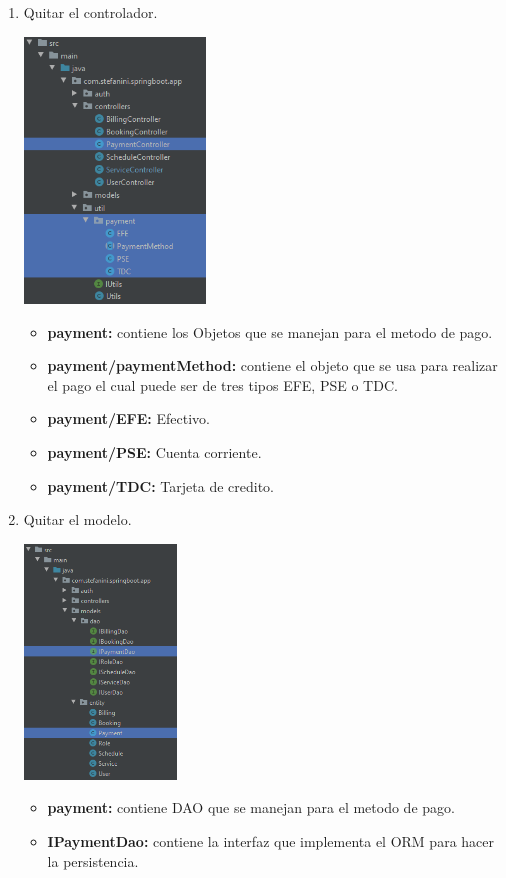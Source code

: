 \documentclass[10pt,a4paper,openany]{book}
\begin{document}
\begin{enumerate}
\item Quitar el controlador.\\
\begin{center}
\includegraphics[width=0.38\textwidth]{conBk1}
\end{center}
\begin{itemize}
	\item \textbf{payment:} contiene los Objetos que se manejan para el metodo de pago.
	\item \textbf{payment/paymentMethod:} contiene el objeto que se usa para realizar el pago el cual puede ser de tres tipos EFE, PSE o TDC.
	\item \textbf{payment/EFE:} Efectivo.
	\item \textbf{payment/PSE:} Cuenta corriente. 
	\item \textbf{payment/TDC:} Tarjeta de credito.
\end{itemize}

\item Quitar el modelo.\\
\begin{center}
\includegraphics[width=0.32\textwidth]{conBk2}
\end{center}
\begin{itemize}
	\item \textbf{payment:} contiene DAO que se manejan para el metodo de pago.
	\item \textbf{IPaymentDao:} contiene la interfaz que implementa el ORM para hacer la persistencia.
\end{itemize}



\end{enumerate}
\end{document}

